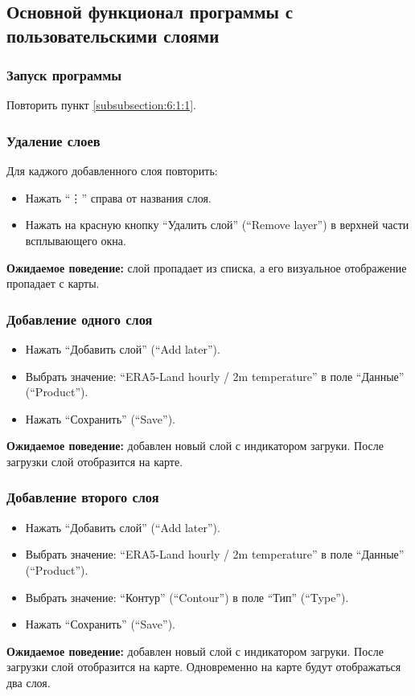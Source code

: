 \documentclass[a4paper, 12pt]{article}
\begin{document}
	\subsection{Основной функционал программы с пользовательскими слоями}
	\subsubsection{Запуск программы}
	Повторить пункт \ref{subsubsection:6:1:1}.

	\subsubsection{Удаление слоев}
	Для каджого добавленного слоя повторить:
	\begin{itemize}
		\item Нажать \enquote{\vdots} справа от названия слоя.
		\item Нажать на красную кнопку \enquote{Удалить слой} (\enquote{Remove layer}) в верхней части всплывающего окна.
	\end{itemize}
	\textbf{Ожидаемое поведение:} слой пропадает из списка, а его визуальное отображение пропадает с карты.

	\subsubsection{Добавление одного слоя}
	\begin{itemize}
		\item Нажать \enquote{Добавить слой} (\enquote{Add later}).
		\item Выбрать значение: \enquote{ERA5-Land hourly / 2m temperature} в поле \enquote{Данные} (\enquote{Product}).
		\item Нажать \enquote{Сохранить} (\enquote{Save}).
	\end{itemize}
	\textbf{Ожидаемое поведение:} добавлен новый слой с индикатором загруки. После загрузки слой отобразится на карте.

	\subsubsection{Добавление второго слоя}
	\begin{itemize}
		\item Нажать \enquote{Добавить слой} (\enquote{Add later}).
		\item Выбрать значение: \enquote{ERA5-Land hourly / 2m temperature} в поле \enquote{Данные} (\enquote{Product}).
		\item Выбрать значение: \enquote{Контур} (\enquote{Contour}) в поле \enquote{Тип} (\enquote{Type}).
		\item Нажать \enquote{Сохранить} (\enquote{Save}).
	\end{itemize}
	\textbf{Ожидаемое поведение:} добавлен новый слой с индикатором загруки. После загрузки слой отобразится на карте. Одновременно на карте будут отображаться два слоя.
\end{document}
